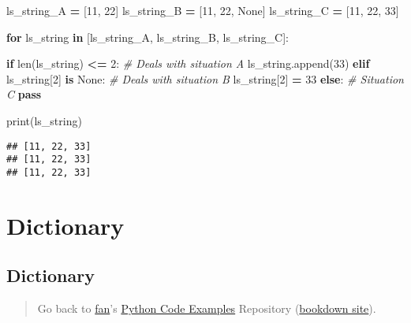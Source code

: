 \documentclass[
]{book}
\newenvironment{Shaded}{\begin{snugshade}}{\end{snugshade}}
\newcommand{\BuiltInTok}[1]{#1}
\newcommand{\CommentTok}[1]{\textcolor[rgb]{0.56,0.35,0.01}{\textit{#1}}}
\newcommand{\ControlFlowTok}[1]{\textcolor[rgb]{0.13,0.29,0.53}{\textbf{#1}}}
\newcommand{\DecValTok}[1]{\textcolor[rgb]{0.00,0.00,0.81}{#1}}
\newcommand{\KeywordTok}[1]{\textcolor[rgb]{0.13,0.29,0.53}{\textbf{#1}}}
\newcommand{\NormalTok}[1]{#1}
\newcommand{\OperatorTok}[1]{\textcolor[rgb]{0.81,0.36,0.00}{\textbf{#1}}}
\newcommand{\VariableTok}[1]{\textcolor[rgb]{0.00,0.00,0.00}{#1}}
\begin{document}
\begin{Shaded}
\begin{Highlighting}[]

\NormalTok{ls_string_A }\OperatorTok{=}\NormalTok{ [}\DecValTok{11}\NormalTok{, }\DecValTok{22}\NormalTok{]}
\NormalTok{ls_string_B }\OperatorTok{=}\NormalTok{ [}\DecValTok{11}\NormalTok{, }\DecValTok{22}\NormalTok{, }\VariableTok{None}\NormalTok{]}
\NormalTok{ls_string_C }\OperatorTok{=}\NormalTok{ [}\DecValTok{11}\NormalTok{, }\DecValTok{22}\NormalTok{, }\DecValTok{33}\NormalTok{]}

\ControlFlowTok{for}\NormalTok{ ls_string }\KeywordTok{in}\NormalTok{ [ls_string_A, ls_string_B, ls_string_C]:}

  \ControlFlowTok{if} \BuiltInTok{len}\NormalTok{(ls_string) }\OperatorTok{<=} \DecValTok{2}\NormalTok{:}
    \CommentTok{# Deals with situation A}
\NormalTok{    ls_string.append(}\DecValTok{33}\NormalTok{)}
  \ControlFlowTok{elif}\NormalTok{ ls_string[}\DecValTok{2}\NormalTok{] }\KeywordTok{is} \VariableTok{None}\NormalTok{:}
    \CommentTok{# Deals with situation B}
\NormalTok{    ls_string[}\DecValTok{2}\NormalTok{] }\OperatorTok{=} \DecValTok{33}
  \ControlFlowTok{else}\NormalTok{:}
    \CommentTok{# Situation C}
    \ControlFlowTok{pass}

  \BuiltInTok{print}\NormalTok{(ls_string)}
\end{Highlighting}
\end{Shaded}

\begin{verbatim}
## [11, 22, 33]
## [11, 22, 33]
## [11, 22, 33]
\end{verbatim}

\hypertarget{dictionary}{%
\section{Dictionary}\label{dictionary}}

\hypertarget{dictionary-1}{%
\subsection{Dictionary}\label{dictionary-1}}

\begin{quote}
Go back to \href{http://fanwangecon.github.io/}{fan}'s \href{https://fanwangecon.github.io/pyfan/}{Python Code Examples} Repository (\href{https://fanwangecon.github.io/pyfan/bookdown}{bookdown site}).
\end{quote}
\end{document}
